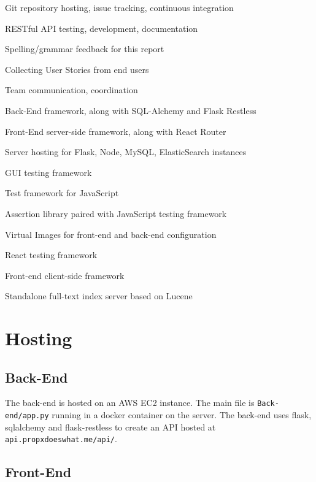 \documentclass[12pt]{article}
\newcommand{\code}[1]{\texttt{#1}}
\begin{document}
\begin{description}[font=\bfseries,nosep]
	\item[GitLab] Git repository hosting, issue tracking, continuous integration
	\item[Postman] RESTful API testing, development, documentation
	\item[Grammarly] Spelling/grammar feedback for this report
	\item[Piazza] Collecting User Stories from end users
	\item[Slack] Team communication, coordination
	\item[Flask] Back-End framework, along with SQL-Alchemy and Flask Restless
	\item[React] Front-End server-side framework, along with React Router
	\item[AWS] Server hosting for Flask, Node, MySQL, ElasticSearch instances
	\item[Selenium] GUI testing framework
	\item[Mocha] Test framework for JavaScript
	\item[Chai] Assertion library paired with JavaScript testing framework
	\item[Docker] Virtual Images for front-end and back-end configuration
	\item[Enzyme] React testing framework
	\item[Bootstrap] Front-end client-side framework
	\item[ElasticSearch] Standalone full-text index server based on Lucene
\end{description}

\section{Hosting}

\subsection{Back-End}

The back-end is hosted on an AWS EC2 instance. The main file is \code{Back-end/app.py} running in a docker container on the server. The back-end uses flask, sqlalchemy and flask-restless to create an API hosted at \code{api.propxdoeswhat.me/api/}.

\subsection{Front-End}
\end{document}
